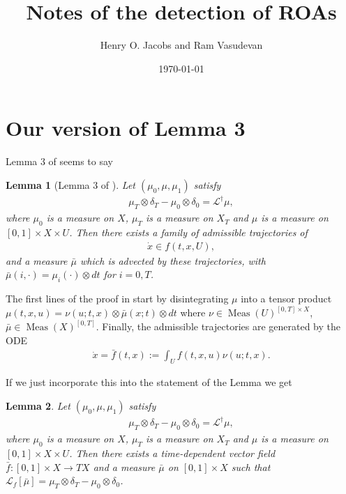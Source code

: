 \documentclass[12pt]{amsart}
\title{Notes of the detection of ROAs}
\author{Henry O. Jacobs and Ram Vasudevan}
\date{\today}
\DeclareMathOperator{\Meas}{Meas}
\newtheorem{lem}{Lemma}
\begin{document}
\maketitle

\section{Our version of Lemma 3}

Lemma 3 of \cite{HenrionKorda2013} seems to say

\begin{lem}[Lemma 3 of \cite{HenrionKorda2013}]
  Let $(\mu_0,\mu,\mu_1)$ satisfy
  \begin{align*}
    \mu_T \otimes \delta_T - \mu_0 \otimes \delta_0 = \mathcal{L}^\dagger \mu,
  \end{align*}
  where $\mu_0$ is a measure on $X$, $\mu_T$ is a measure on $X_T$ and $\mu$ is a measure on $[0,1] \times X \times U$.
  Then there exists a family of admissible trajectories of
  \begin{align*}
    \dot{x} \in f( t , x , U),
  \end{align*}
  and a measure $\bar{\mu}$ which is advected by these trajectories, with $\bar{\mu}(i , \cdot ) = \mu_i( \cdot ) \otimes dt$ for $i=0,T$.
\end{lem}

The first lines of the proof in \cite{HenrionKorda2013} start by disintegrating $\mu$ into a tensor product $\mu(t,x,u) = \nu( u ; t,x) \otimes \bar{\mu}(x; t) \otimes dt$ where $\nu \in \Meas(U)^{ [0,T] \times X}$, $\bar{\mu} \in \Meas(X)^{[0,T]}$.
Finally, the admissible trajectories are generated by the ODE
\begin{align*}
  \dot{x} = \bar{f}(t,x) := \int_U f(t,x,u) \nu(u ; t,x).
\end{align*}

If we just incorporate this into the statement of the Lemma we get

\begin{lem}
  Let $(\mu_0,\mu,\mu_1)$ satisfy
  \begin{align*}
    \mu_T \otimes \delta_T - \mu_0 \otimes \delta_0 = \mathcal{L}^\dagger \mu,
  \end{align*}
  where $\mu_0$ is a measure on $X$, $\mu_T$ is a measure on $X_T$ and $\mu$ is a measure on $[0,1] \times X \times U$.
  Then there exists a time-dependent vector field $\bar{f}:[0,1] \times X \to TX$
and a measure $\bar{\mu}$ on $[0,1] \times X$ such that $\mathcal{L}_f [ \bar{\mu} ] = \mu_T \otimes \delta_T - \mu_0 \otimes \delta_0$.
\end{lem}
\end{document}
